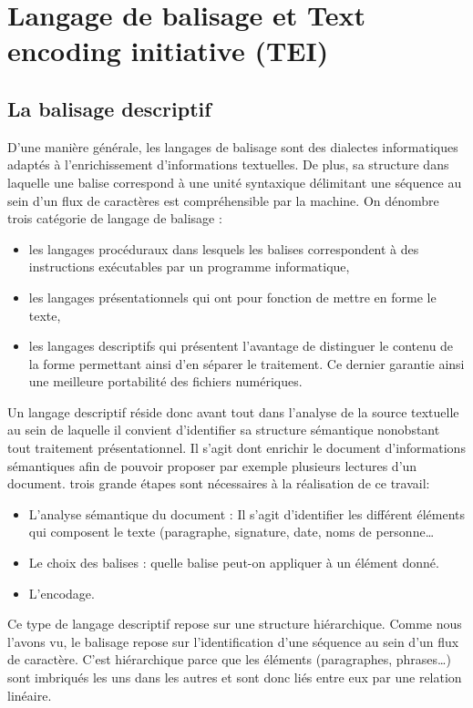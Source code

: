 \documentclass[12pt,a4paper,oneside]{book} %
\begin{document}
\chapter{Langage de balisage et Text encoding initiative (TEI)}

\section{La balisage descriptif}
D'une manière générale, les langages de balisage sont des dialectes informatiques adaptés à l'enrichissement d'informations textuelles. De plus, sa structure dans laquelle une balise correspond à une unité syntaxique délimitant une séquence au sein d'un flux de caractères est compréhensible par la machine.
\bigskip
On dénombre trois catégorie de langage de balisage : 
\begin{itemize}
\item les langages procéduraux dans lesquels les balises correspondent à des instructions exécutables par un programme informatique,
\item les langages présentationnels qui ont pour fonction de mettre en forme le texte,
\item les langages descriptifs qui présentent l'avantage de distinguer le contenu de la forme permettant ainsi d'en séparer le traitement. Ce dernier garantie ainsi une meilleure portabilité des fichiers numériques.
\end{itemize}
\bigskip 

Un langage descriptif réside donc avant tout dans l'analyse de la source textuelle au sein de laquelle il convient d'identifier sa structure sémantique nonobstant tout traitement présentationnel. Il s'agit dont enrichir le document d'informations sémantiques afin de pouvoir proposer par exemple plusieurs lectures d'un document. trois grande étapes sont nécessaires à la réalisation de ce travail:
\bigskip

\begin{itemize}
\item L'analyse sémantique du document : Il s'agit d'identifier les différent éléments qui composent le texte (paragraphe, signature, date, noms de personne\dots
\item Le choix des balises : quelle balise peut-on appliquer à un élément donné.
\item L'encodage. 
\end{itemize} 
\bigskip 

Ce type de langage descriptif repose sur une structure hiérarchique. Comme nous l'avons vu, le balisage repose sur l'identification d'une séquence au sein d'un flux de caractère. C'est hiérarchique parce que les éléments (paragraphes, phrases\dots) sont imbriqués les uns dans les autres et sont donc liés entre eux par une relation linéaire.
\bigskip 
\end{document}
